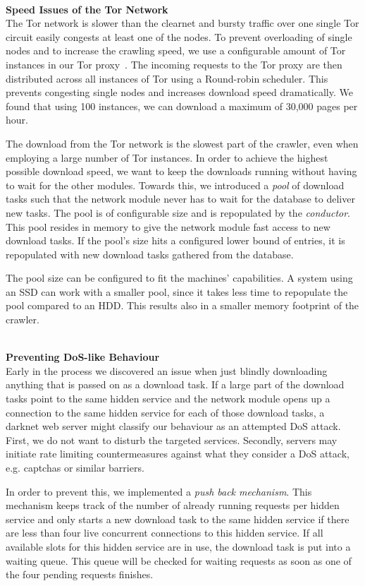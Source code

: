 \documentclass[USenglish,oneside,twocolumn]{article}
\newcommand{\sh}[1]{\noindent\vspace{0.5\baselineskip}\\ \textbf{#1}\\}
\begin{document}
\sh{Speed Issues of the Tor Network} 
The Tor network is slower than the clearnet \cite{TorMetricsPerformance} and bursty traffic over one single Tor circuit easily congests at least one of the nodes. To prevent overloading of single nodes and to increase the crawling speed, we use a configurable amount of Tor instances in our Tor proxy~\cite{Boyd}. The incoming requests to the Tor proxy are then distributed across all instances of Tor using a Round-robin scheduler. This prevents congesting single nodes and increases download speed dramatically. We found that using 100 instances, we can download a maximum of 30,000 pages per hour.

The download from the Tor network is the slowest part of the crawler, even when employing a large number of Tor instances. In order to achieve the highest possible download speed, we want to keep the downloads running without having to wait for the other modules. Towards this, we introduced a \emph{pool} of download tasks such that the network module never has to wait for the database to deliver new tasks. The pool is of configurable size and is repopulated by the \emph{conductor}. This pool resides in memory to give the network module fast access to new download tasks. If the pool's size hits a configured lower bound of entries, it is repopulated with new download tasks gathered from the database.

The pool size can be configured to fit the machines' capabilities. A system using an SSD can work with a smaller pool, since it takes less time to repopulate the pool compared to an HDD. This results also in a smaller memory footprint of the crawler.

\sh{Preventing DoS-like Behaviour}
\label{sec:DoSLike}
Early in the process we discovered an issue when just blindly downloading anything that is passed on as a download task. If a large part of the download tasks point to the same hidden service and the network module opens up a connection to the same hidden service for each of those download tasks, a darknet web server might classify our behaviour as an attempted DoS attack. First, we do not want to disturb the targeted services. Secondly, servers may initiate rate limiting countermeasures against what they consider a DoS attack, e.g. captchas or similar barriers.

In order to prevent this, we implemented a \emph{push back mechanism}. This mechanism keeps track of the number of already running requests per hidden service and only starts a new download task to the same hidden service if there are less than four live concurrent connections to this hidden service. If all available slots for this hidden service are in use, the download task is put into a waiting queue. This queue will be checked for waiting requests as soon as one of the four pending requests finishes.
\end{document}
